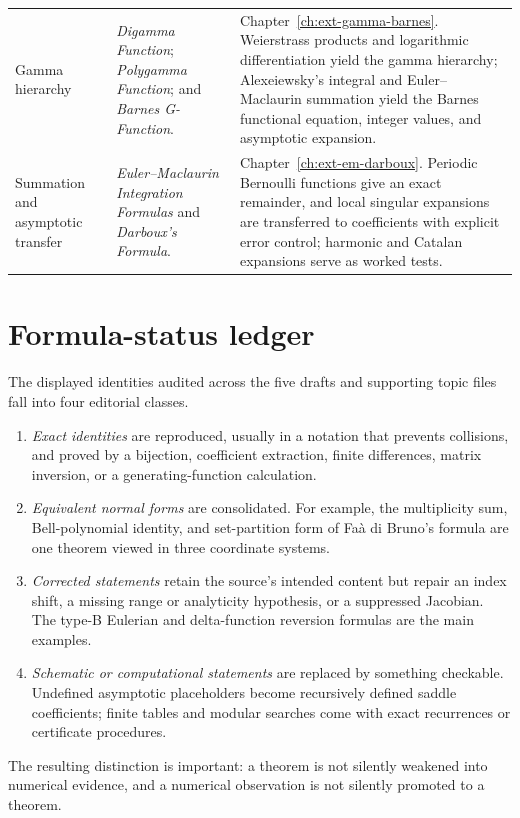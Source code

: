 \documentclass[11pt,a4paper,oneside,openany]{book}
\theoremstyle{definition}
\theoremstyle{remark}
\begin{document}
\begin{longtable}{>{\raggedright\arraybackslash}p{}
                  >{\raggedright\arraybackslash}p{}
                  >{\raggedright\arraybackslash}p{}}
Gamma hierarchy
& \emph{Digamma Function}; \emph{Polygamma Function}; and \emph{Barnes
  G-Function}.
& Chapter~\ref{ch:ext-gamma-barnes}.  Weierstrass products and logarithmic
  differentiation yield the gamma hierarchy; Alexeiewsky's integral and
  Euler--Maclaurin summation yield the Barnes functional equation, integer
  values, and asymptotic expansion.\\[1ex]

Summation and asymptotic transfer
& \emph{Euler--Maclaurin Integration Formulas} and \emph{Darboux's Formula}.
& Chapter~\ref{ch:ext-em-darboux}.  Periodic Bernoulli functions give an exact
  remainder, and local singular expansions are transferred to coefficients
  with explicit error control; harmonic and Catalan expansions serve as worked
  tests.\\
\end{longtable}
\renewcommand{\arraystretch}{1}


\section{Formula-status ledger}
The displayed identities audited across the five drafts and supporting topic files
fall into four editorial classes.
\begin{enumerate}
\item \emph{Exact identities} are reproduced, usually in a notation that prevents
      collisions, and proved by a bijection, coefficient extraction, finite
      differences, matrix inversion, or a generating-function calculation.
\item \emph{Equivalent normal forms} are consolidated.  For example, the
      multiplicity sum, Bell-polynomial identity, and set-partition form of Faà di
      Bruno's formula are one theorem viewed in three coordinate systems.
\item \emph{Corrected statements} retain the source's intended content but repair
      an index shift, a missing range or analyticity hypothesis, or a suppressed
      Jacobian.  The type-B Eulerian and delta-function reversion formulas are the
      main examples.
\item \emph{Schematic or computational statements} are replaced by something
      checkable.  Undefined asymptotic placeholders become recursively defined
      saddle coefficients; finite tables and modular searches come with exact
      recurrences or certificate procedures.
\end{enumerate}
The resulting distinction is important: a theorem is not silently weakened into
numerical evidence, and a numerical observation is not silently promoted to a
theorem.
\end{document}
